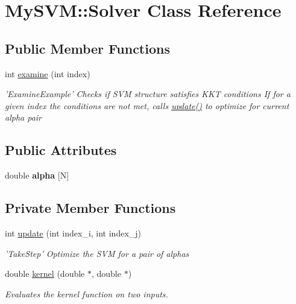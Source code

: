 \hypertarget{classMySVM_1_1Solver}{
\section{MySVM::Solver Class Reference}
\label{classMySVM_1_1Solver}
}
\subsection*{Public Member Functions}
\begin{DoxyCompactItemize}
\item 
int \hyperlink{classMySVM_1_1Solver_ac0cd4065504fa00e8ee855213d3b6b2c}{examine} (int index)
\begin{DoxyCompactList}\small\item\em 'ExamineExample' Checks if SVM structure satisfies KKT conditions If for a given index the conditions are not met, calls \hyperlink{classMySVM_1_1Solver_a82517a56e857e500a351baa9ac2909d0}{update()} to optimize for current alpha pair \end{DoxyCompactList}\end{DoxyCompactItemize}
\subsection*{Public Attributes}
\begin{DoxyCompactItemize}
\item 
\hypertarget{classMySVM_1_1Solver_a699b9aeb1aa2f5dafda0944409adb68e}{
double {\bfseries alpha} \mbox{[}N\mbox{]}}
\label{classMySVM_1_1Solver_a699b9aeb1aa2f5dafda0944409adb68e}

\end{DoxyCompactItemize}
\subsection*{Private Member Functions}
\begin{DoxyCompactItemize}
\item 
int \hyperlink{classMySVM_1_1Solver_a82517a56e857e500a351baa9ac2909d0}{update} (int index\_\-i, int index\_\-j)
\begin{DoxyCompactList}\small\item\em 'TakeStep' Optimize the SVM for a pair of alphas \end{DoxyCompactList}\item 
double \hyperlink{classMySVM_1_1Solver_a8930f71f39a1c36b99c7b0ac33c3f23c}{kernel} (double $\ast$, double $\ast$)
\begin{DoxyCompactList}\small\item\em Evaluates the kernel function on two inputs. \end{DoxyCompactList}\end{DoxyCompactItemize}
